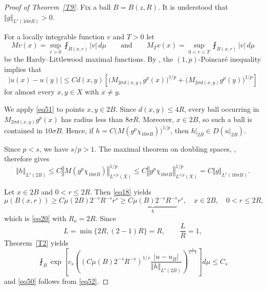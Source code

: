 \documentclass[12pt,leqno]{amsart}
\theoremstyle{definition}
\numberwithin{theorem}{section} \numberwithin{equation}{section}
\begin{document}
\begin{proof}[Proof of Theorem~\ref{T9}]
Fix a ball $B=B(z,R)$. It is understood that
$\Vert g\Vert_{L^s(10\sigma B)}>0$.

For a locally integrable function $v$ and $T>0$ let
\[
Mv(x)=\sup_{r>0}\fint_{B(x,r)}|v|\,d\mu
\qquad
\text{and}
\qquad
 M_Tv(x)=\sup_{0<r<T}\fint_{B(x,r)}|v|\,d\mu
\]
be the Hardy--Littlewood maximal functions. By \cite[Theorem~3.2]{SMP}, the $(1,p)$-Poincar\'e inequality implies that
\begin{equation}
\label{eq51}
 |u(x)-u(y)|
 \leq C d(x,y)
 \left[
 \big(M_{2\sigma d(x,y)}g^p(x)\big)^{1/p}
 +\big(M_{2\sigma d(x,y)}g^p(y)\big)^{1/p}
 \right]
\end{equation}
for almost every $x,y\in X$ with $x\neq y$.

We apply \eqref{eq51} to points $x,y\in2B$. Since
$d(x,y)\leq 4R$,
every ball occurring in $M_{2\sigma d(x,y)}g^p(x)$ has radius less than $8\sigma R$. Moreover, $x\in2B$, so such a ball is contained in $10\sigma B$. Hence, if
$h=C\big(M(g^p\chi_{10\sigma B})\big)^{1/p}$,
then $h|_{2B}\in D(u|_{2B})$. 

Since $p<s$, we have $s/p>1$. The maximal theorem on doubling spaces, \cite[Theorem~14.13]{SMP}, therefore gives
\begin{equation}
\label{eq52}
\Vert h\Vert_{L^s(2B)}
\leq C
\left\Vert M(g^p\chi_{10\sigma B})\right\Vert_{L^{s/p}(X)}^{1/p}
\leq C
\left\Vert g^p\chi_{10\sigma B}\right\Vert_{L^{s/p}(X)}^{1/p}
 =C\Vert g\Vert_{L^s(10\sigma B)}.
\end{equation}

Let $x\in 2B$ and $0<r\leq 2R$. Then \eqref{eq18} yields
\[
\mu(B(x,r))\geq C\mu(2B)2^{-s}R^{-s}r^s\geq\underbrace{C\mu(B)2^{-s}R^{-s}}_{b}r^s,
\quad
x\in 2B,
\quad
0<r\leq 2R,
\]
which is \eqref{eq20} with $R_o=2R$. Since
\[
L=\min\{2R,(2-1)R\}=R,
\qquad
\frac{L}{R}=1,
\]
Theorem~\ref{T2} yields
\[
\fint_B
\exp\left[
 c_s\left(
 (C\mu(B)2^{-s}R^{-s})^{1/s}
 \frac{|u-u_B|}{\Vert h\Vert_{L^s(2B)}}
 \right)^{\frac{s}{s-1}}
 \right]d\mu
\leq C_s
\]
and \eqref{eq50} follows from \eqref{eq52}.
\end{proof}
\end{document}
